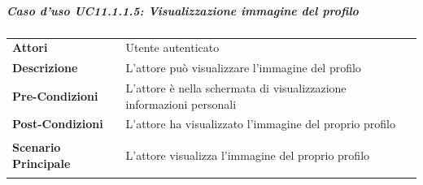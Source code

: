 \subparagraph{Caso d'uso UC11.1.1.5: Visualizzazione immagine del profilo}
\label{UC11_1_1_5}
\begin{minipage}{\linewidth}
	\begin{tabular}{ l | p{11cm}}
		\hline
		\rowcolor{Gray}
		\multicolumn{2}{c}{UC11.1.1.5 - Visualizzazione immagine del profilo} \\
		\hline
		\textbf{Attori} & Utente autenticato \\
		\textbf{Descrizione} & L'attore può visualizzare l'immagine del profilo\\
		\textbf{Pre-Condizioni} & L'attore è nella schermata di visualizzazione informazioni personali\\
		\textbf{Post-Condizioni} & L'attore ha visualizzato l'immagine del proprio profilo \\
		\textbf{Scenario Principale} & 
		\begin{enumerate*}[label=(\arabic*.),itemjoin={\newline}]
			\item L'attore visualizza l'immagine del proprio profilo
		\end{enumerate*}
	\end{tabular}
\end{minipage}

